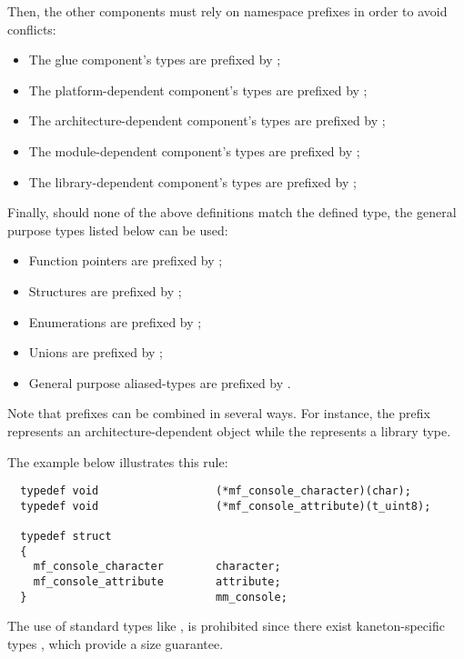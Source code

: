 Then, the other components must rely on namespace prefixes in order
to avoid conflicts:

\begin{itemize}
  \item
    The glue component's types are prefixed by ;
  \item
    The platform-dependent component's types are prefixed by ;
  \item
    The architecture-dependent component's types are prefixed by ;
  \item
    The module-dependent component's types are prefixed by ;
  \item
    The library-dependent component's types are prefixed by ;
\end{itemize}

Finally, should none of the above definitions match the defined
type, the general purpose types listed below can be used:

\begin{itemize}
  \item
    Function pointers are prefixed by ;
  \item
    Structures are prefixed by ;
  \item
    Enumerations are prefixed by ;
  \item
    Unions are prefixed by ;
  \item
    General purpose aliased-types are prefixed by .
\end{itemize}

Note that prefixes can be combined in several ways. For instance, the prefix
 represents an architecture-dependent object while the 
represents a library type.

The example below illustrates this rule:

\begin{verbatim}
  typedef void                  (*mf_console_character)(char);
  typedef void                  (*mf_console_attribute)(t_uint8);

  typedef struct
  {
    mf_console_character        character;
    mf_console_attribute        attribute;
  }                             mm_console;
\end{verbatim}

The use of  standard types like , 
is prohibited since there exist kaneton-specific types ,
 which provide a size guarantee.

